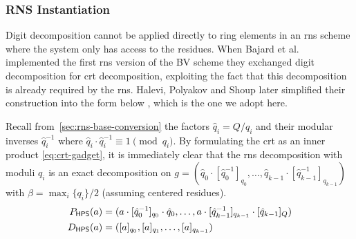 \subsubsection{RNS Instantiation}
\label{sec:hps}
Digit decomposition cannot be applied directly to ring elements in an \gls{rns} scheme where the system only has access to the residues. When Bajard et al. implemented the first \gls{rns} version of the BV scheme \cite{cryptoeprint:2016/510} they exchanged digit decomposition for \gls{crt} decomposition, exploiting the fact that this decomposition is already required by the \gls{rns}. Halevi, Polyakov and Shoup later simplified their construction into the form below \cite{cryptoeprint:2018/117}, which is the one we adopt here.

\begin{definition}
    Recall from~\autoref{sec:rns-base-conversion} the factors $\hat{q}_i = Q/q_i$ and their modular inverses $\hat{q}_i^{-1}$ where $\hat{q}_i\cdot\hat{q}_i^{-1} \equiv 1 \pmod{q_i}$. By formulating the \gls{crt} as an inner product \eqref{eq:crt-gadget}, it is immediately clear that the \gls{rns} decomposition with moduli $q_i$ is an exact decomposition on $g = (\hat{q}_0\cdot[\hat{q}_0^{-1}]_{q_0}, \dots, \hat{q}_{k-1}\cdot[\hat{q}_{k-1}^{-1}]_{q_{k-1}})$ with $\beta = \max_i\{q_i\}/2$ (assuming centered residues).
    \begin{align}
        \label{def:hps:P}
        {P}_{\mathsf{HPS}}(a) &= (a\cdot[\hat{q}^{-1}_0]_{q_0}\cdot \hat{q}_0, \dots, a\cdot[\hat{q}^{-1}_{k-1}]_{q_{k-1}}\cdot [\hat{q}_{k-1}]_Q) \\
        \label{def:hps:D}
        {D}_{\mathsf{HPS}}(a) &= ([a]_{q_0}, [a]_{q_1}, \dots, [a]_{q_{k-1}})
    \end{align}
\end{definition}

